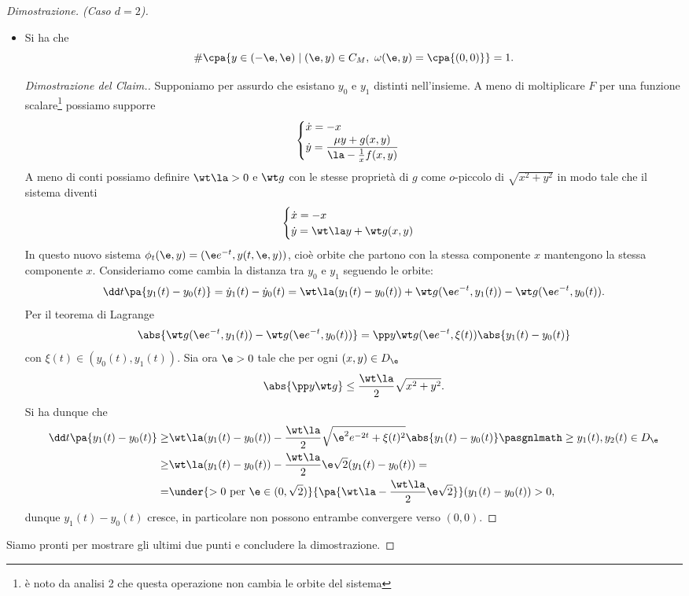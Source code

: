 \begin{proof}[Dimostrazione. (Caso $d=2$)]
\begin{itemize}
\begin{proof}[Dimostrazione del Claim.]
\begin{itemize}
\end{itemize}
\setlength{\leftmargini}{0.5cm}
\end{proof}
\item[\ul{Claim}:] Si ha che
\[\#\cpa{y\in(-\e,\e)\mid (\e,y)\in C_M,\ \omega(\e,y)=\cpa{(0,0)}}=1.\]
\begin{proof}[Dimostrazione del Claim.]
Supponiamo per assurdo che esistano $y_0$ e $y_1$ distinti nell'insieme. A meno di moltiplicare $F$ per una funzione scalare\footnote{\`e noto da analisi 2 che questa operazione non cambia le orbite del sistema} possiamo supporre
\[\begin{cases}
\dot x=-x\\
\displaystyle\dot y=\frac{\mu y+g(x,y)}{\la-\frac1xf(x,y)}
\end{cases}\]
A meno di conti possiamo definire $\wt \la>0$ e $\wt g$ con le stesse propriet\`a di $g$ come $o$-piccolo di $\sqrt{x^2+y^2}$ in modo tale che il sistema diventi
\[\begin{cases}
\dot x=-x\\
\dot y=\wt \la y+\wt g(x,y)
\end{cases}\]
In questo nuovo sistema $\phi_t(\e,y)=(\e e^{-t},y(t,\e,y))$, cio\`e orbite che partono con la stessa componente $x$ mantengono la stessa componente $x$. Consideriamo come cambia la distanza tra $y_0$ e $y_1$ seguendo le orbite:
\[\dd t{}\pa{y_1(t)-y_0(t)}=\dot y_1(t)-\dot y_0(t)=\wt \la(y_1(t)-y_0(t))+\wt g(\e e^{-t},y_1(t))-\wt g(\e e^{-t},y_0(t)).\]
Per il teorema di Lagrange
\[\abs{\wt g(\e e^{-t},y_1(t))-\wt g(\e e^{-t},y_0(t))}= \pp y{\wt g}(\e e^{-t},\xi(t))\abs{y_1(t)-y_0(t)}\]
con $\xi(t)\in (y_0(t),y_1(t))$. 
Sia ora $\e>0$ tale che per ogni $(x,y)\in D_\e$
\[\abs{\pp y{\wt g}}\leq \frac{\wt \la}2\sqrt{x^2+y^2}.\]
Si ha dunque che
\begin{align*}
\dd t{}\pa{y_1(t)-y_0(t)}\geq& \wt \la(y_1(t)-y_0(t))-\frac{\wt \la}2\sqrt{\e^2e^{-2t}+\xi(t)^2}\abs{y_1(t)-y_0(t)}\pasgnlmath\geq{y_1(t),y_2(t)\in D_\e}\\
\geq& \wt \la(y_1(t)-y_0(t))-\frac{\wt \la}2\e \sqrt 2 (y_1(t)-y_0(t))=\\
=&\under{>0\text{ per }\e\in(0,\sqrt 2)}{\pa{\wt \la-\frac{\wt \la}2\e\sqrt 2}}(y_1(t)-y_0(t))>0,
\end{align*}
dunque $y_1(t)-y_0(t)$ cresce, in particolare non possono entrambe convergere verso $(0,0)$.
\end{proof}
\end{itemize}
\noindent Siamo pronti per mostrare gli ultimi due punti e concludere la dimostrazione.
\smallskip


\end{proof}

